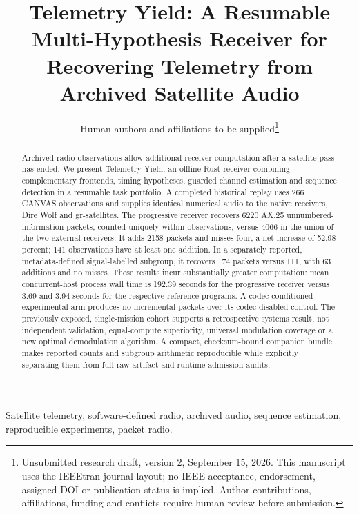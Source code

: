 \documentclass[journal]{IEEEtran}
\begin{document}
\title{Telemetry Yield: A Resumable Multi-Hypothesis Receiver for Recovering Telemetry from Archived Satellite Audio}
\author{Human authors and affiliations to be supplied\thanks{Unsubmitted research draft, version 2, September 15, 2026. This manuscript uses the IEEEtran journal layout; no IEEE acceptance, endorsement, assigned DOI or publication status is implied. Author contributions, affiliations, funding and conflicts require human review before submission.}}
\maketitle

\begin{abstract}
Archived radio observations allow additional receiver computation after a satellite pass has ended. We present Telemetry Yield, an offline Rust receiver combining complementary frontends, timing hypotheses, guarded channel estimation and sequence detection in a resumable task portfolio. A completed historical replay uses 266 CANVAS observations and supplies identical numerical audio to the native receivers, Dire Wolf and gr-satellites. The progressive receiver recovers 6220 AX.25 unnumbered-information packets, counted uniquely within observations, versus 4066 in the union of the two external receivers. It adds 2158 packets and misses four, a net increase of 52.98 percent; 141 observations have at least one addition. In a separately reported, metadata-defined signal-labelled subgroup, it recovers 174 packets versus 111, with 63 additions and no misses. These results incur substantially greater computation: mean concurrent-host process wall time is 192.39 seconds for the progressive receiver versus 3.69 and 3.94 seconds for the respective reference programs. A codec-conditioned experimental arm produces no incremental packets over its codec-disabled control. The previously exposed, single-mission cohort supports a retrospective systems result, not independent validation, equal-compute superiority, universal modulation coverage or a new optimal demodulation algorithm. A compact, checksum-bound companion bundle makes reported counts and subgroup arithmetic reproducible while explicitly separating them from full raw-artifact and runtime admission audits.
\end{abstract}
\begin{IEEEkeywords}
Satellite telemetry, software-defined radio, archived audio, sequence estimation, reproducible experiments, packet radio.
\end{IEEEkeywords}
\end{document}
